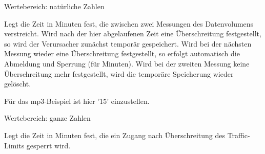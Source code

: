 \begin{description}
   
   
   Wertebereich: natürliche Zahlen

   Legt die Zeit in Minuten fest, die zwischen zwei Messungen des Datenvolumens verstreicht. Wird nach der
   hier abgelaufenen Zeit eine Überschreitung festgestellt, so wird der Verursacher zunächst temporär
   gespeichert. Wird bei der nächsten Messung wieder eine Überschreitung festgestellt, so erfolgt automatisch
   die Abmeldung und Sperrung (für  Minuten).
   Wird bei der zweiten Messung keine Überschreitung mehr festgestellt, wird die temporäre Speicherung wieder
   gelöscht.

   Für das mp3-Beispiel ist hier '15' einzustellen.

   
   
   Wertebereich: ganze Zahlen

   Legt die Zeit in Minuten fest, die ein Zugang nach Überschreitung des Traffic-Limits gesperrt wird.
   
   
\end{description}
